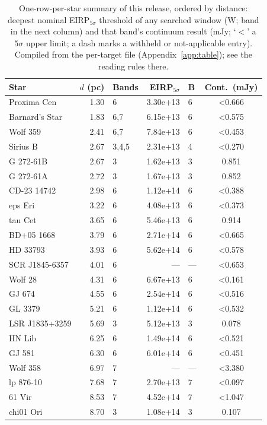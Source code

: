 \documentclass{openjournal}
\begin{document}
\begin{table}
\centering
\scriptsize
\setlength{\tabcolsep}{4pt}
\caption{One-row-per-star summary of this release, ordered by
distance: deepest nominal EIRP$_{5\sigma}$ threshold of any searched
window (W; band in the next column) and that band's continuum result
(mJy; `$<$' a $5\sigma$ upper limit; a dash marks a withheld or
not-applicable entry). Compiled from the per-target file (Appendix~\ref{app:table}); see the reading rules
there.}
\label{tab:starsummary}
\begin{tabular}{@{}lrlrlc@{}}
\hline
Star & $d$ (pc) & Bands & EIRP$_{5\sigma}$ & B & Cont.\ (mJy) \\
\hline
Proxima Cen & 1.30 & 6 & 3.30e+13 & 6 & <0.666 \\
Barnard's Star & 1.83 & 6,7 & 6.15e+13 & 6 & <0.575 \\
Wolf  359 & 2.41 & 6,7 & 7.84e+13 & 6 & <0.453 \\
Sirius B & 2.67 & 3,4,5 & 2.31e+13 & 4 & <0.270 \\
G 272-61B & 2.67 & 3 & 1.62e+13 & 3 & 0.851 \\
G 272-61A & 2.72 & 3 & 1.67e+13 & 3 & 0.852 \\
CD-23 14742 & 2.98 & 6 & 1.12e+14 & 6 & <0.388 \\
eps Eri & 3.22 & 6 & 4.08e+13 & 6 & <0.373 \\
tau Cet & 3.65 & 6 & 5.46e+13 & 6 & 0.914 \\
BD+05  1668 & 3.79 & 6 & 2.71e+14 & 6 & <0.665 \\
HD 33793 & 3.93 & 6 & 5.62e+14 & 6 & <0.578 \\
SCR J1845-6357 & 4.01 & 6 & --- & --- & <0.653 \\
Wolf   28 & 4.31 & 6 & 6.67e+13 & 6 & <0.161 \\
GJ 674 & 4.55 & 6 & 2.54e+14 & 6 & <0.516 \\
GL 3379 & 5.21 & 6 & 1.12e+14 & 6 & <0.532 \\
LSR J1835+3259 & 5.69 & 3 & 5.12e+13 & 3 & 0.078 \\
HN Lib & 6.25 & 6 & 1.49e+14 & 6 & <0.521 \\
GJ 581 & 6.30 & 6 & 6.01e+14 & 6 & <0.451 \\
Wolf  358 & 6.97 & 7 & --- & --- & <3.380 \\
lp 876-10 & 7.68 & 7 & 2.70e+13 & 7 & <0.097 \\
61 Vir & 8.53 & 7 & 4.52e+14 & 7 & <1.047 \\
chi01 Ori & 8.70 & 3 & 1.08e+14 & 3 & 0.107 \\

\end{tabular}
\end{table}
\end{document}
